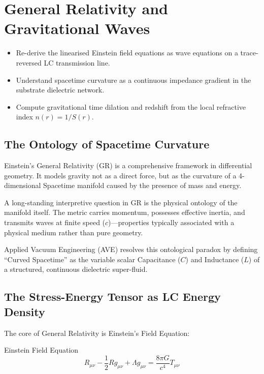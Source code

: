 \chapter{General Relativity and Gravitational Waves}
\label{ch:general_relativity}


\begin{objectivebox}
\begin{itemize}
    \item Re-derive the linearised Einstein field equations as wave equations on a trace-reversed LC transmission line.
    \item Understand spacetime curvature as a continuous impedance gradient in the substrate dielectric network.
    \item Compute gravitational time dilation and redshift from the local refractive index $n(r) = 1/S(r)$.
\end{itemize}
\end{objectivebox}

\section{The Ontology of Spacetime Curvature}
Einstein's General Relativity (GR) is a comprehensive framework in differential geometry. It models gravity not as a direct force, but as the curvature of a 4-dimensional Spacetime manifold caused by the presence of mass and energy. 

A long-standing interpretive question in GR is the physical ontology of the manifold itself. The metric carries momentum, possesses effective inertia, and transmits waves at finite speed ($c$)---properties typically associated with a physical medium rather than pure geometry.

Applied Vacuum Engineering (AVE) resolves this ontological paradox by defining ``Curved Spacetime'' as the variable scalar Capacitance ($C$) and Inductance ($L$) of a structured, continuous dielectric super-fluid.

\section{The Stress-Energy Tensor as LC Energy Density}
The core of General Relativity is Einstein's Field Equation:
\begin{resultbox}{Einstein Field Equation}
\begin{equation}
    R_{\mu\nu} - \frac{1}{2}R g_{\mu\nu} + \Lambda g_{\mu\nu} = \frac{8\pi G}{c^4} T_{\mu\nu}
\end{equation}
\end{resultbox}

